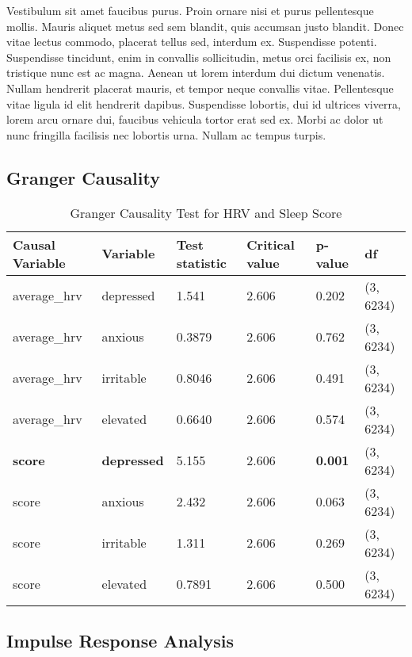 \documentclass{article}
\begin{document}
Vestibulum sit amet faucibus purus. Proin ornare nisi et purus
pellentesque mollis. Mauris aliquet metus sed sem blandit, quis accumsan
justo blandit. Donec vitae lectus commodo, placerat tellus sed, interdum
ex. Suspendisse potenti. Suspendisse tincidunt, enim in convallis
sollicitudin, metus orci facilisis ex, non tristique nunc est ac magna.
Aenean ut lorem interdum dui dictum venenatis. Nullam hendrerit placerat
mauris, et tempor neque convallis vitae. Pellentesque vitae ligula id
elit hendrerit dapibus. Suspendisse lobortis, dui id ultrices viverra,
lorem arcu ornare dui, faucibus vehicula tortor erat sed ex. Morbi ac
dolor ut nunc fringilla facilisis nec lobortis urna. Nullam ac tempus
turpis.

\hypertarget{granger-causality-1}{%
\subsection{Granger Causality}\label{granger-causality-1}}

\begin{table}[ht]
    \centering
    \begin{tabular}{llllll}
    \toprule
        \textbf{Causal Variable} & \textbf{Variable} & \textbf{Test statistic} & \textbf{Critical value} & \textbf{p-value} & \textbf{df} \\ \midrule
        average\_hrv & depressed & 1.541 & 2.606 & 0.202 & (3, 6234) \\ 
        average\_hrv & anxious & 0.3879 & 2.606 & 0.762 & (3, 6234) \\ 
        average\_hrv & irritable & 0.8046 & 2.606 & 0.491 & (3, 6234) \\ 
        average\_hrv & elevated & 0.6640 & 2.606 & 0.574 & (3, 6234) \\ 
        \textbf{score} & \textbf{depressed} & 5.155 & 2.606 & \textbf{0.001} & (3, 6234) \\ 
        score & anxious & 2.432 & 2.606 & 0.063 & (3, 6234) \\ 
        score & irritable & 1.311 & 2.606 & 0.269 & (3, 6234) \\ 
        score & elevated & 0.7891 & 2.606 & 0.500 & (3, 6234) \\ \bottomrule
    \end{tabular}
    \caption{Granger Causality Test for HRV and Sleep Score}
    \label{Granger}
\end{table}


\hypertarget{impulse-response-analysis-1}{%
\subsection{Impulse Response Analysis}\label{impulse-response-analysis-1}}
\end{document}
